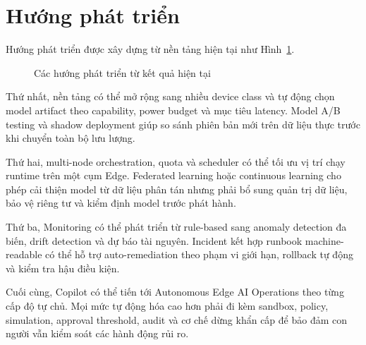\section{Hướng phát triển}

Hướng phát triển được xây dựng từ nền tảng hiện tại như
Hình~\ref{fig:future-directions}.

\begin{figure}[H]
\centering
{}
\caption{Các hướng phát triển từ kết quả hiện tại}
\label{fig:future-directions}
\end{figure}

Thứ nhất, nền tảng có thể mở rộng sang nhiều device class và tự động chọn model
artifact theo capability, power budget và mục tiêu latency. Model A/B testing và
shadow deployment giúp so sánh phiên bản mới trên dữ liệu thực trước khi chuyển
toàn bộ lưu lượng.

Thứ hai, multi-node orchestration, quota và scheduler có thể tối ưu vị trí chạy
runtime trên một cụm Edge. Federated learning hoặc continuous learning cho phép
cải thiện model từ dữ liệu phân tán nhưng phải bổ sung quản trị dữ liệu, bảo vệ
riêng tư và kiểm định model trước phát hành.

Thứ ba, Monitoring có thể phát triển từ rule-based sang anomaly detection đa biến,
drift detection và dự báo tài nguyên. Incident kết hợp runbook machine-readable
có thể hỗ trợ auto-remediation theo phạm vi giới hạn, rollback tự động và kiểm tra
hậu điều kiện.

Cuối cùng, Copilot có thể tiến tới Autonomous Edge AI Operations theo từng cấp
độ tự chủ. Mọi mức tự động hóa cao hơn phải đi kèm sandbox, policy, simulation,
approval threshold, audit và cơ chế dừng khẩn cấp để bảo đảm con người vẫn kiểm
soát các hành động rủi ro.
